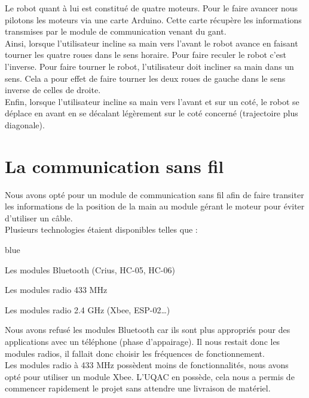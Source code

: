 {Le robot quant à lui est constitué de quatre moteurs. Pour le faire avancer nous pilotons les moteurs via une carte Arduino. Cette carte récupère les informations transmises par le module de communication venant du gant. \\

Ainsi, lorsque l'utilisateur incline sa main vers l'avant le robot avance en faisant tourner les quatre roues dans le sens horaire. Pour faire reculer le robot c'est l'inverse.
Pour faire tourner le robot, l'utilisateur doit incliner sa main dans un sens. Cela a pour effet de faire tourner les deux roues de gauche dans le sens inverse de celles de droite. \\

Enfin, lorsque l'utilisateur incline sa main vers l'avant et sur un coté, le robot se déplace en avant en se décalant légèrement sur le coté concerné (trajectoire plus diagonale).

\section{La communication sans fil}

Nous avons opté pour un module de communication sans fil afin de faire transiter les informations de la position de la main au module gérant le moteur pour éviter d'utiliser un câble.\\
Plusieurs technologies étaient disponibles telles que :

\begin{items}{blue}{\Triangle}
    \item Les modules Bluetooth (Crius, HC-05, HC-06)
    \item Les modules radio 433 MHz
    \item Les modules radio 2.4 GHz (Xbee, ESP-02…)
\end{items}


Nous avons refusé les modules Bluetooth car ils sont plus appropriés pour des applications avec un téléphone (phase d'appairage). Il nous restait donc les modules radios, il fallait donc choisir les fréquences de fonctionnement.\\

Les modules radio à 433 MHz possèdent moins de fonctionnalités, nous avons opté pour utiliser un module Xbee. L’UQAC en possède, cela nous a permis de commencer rapidement le projet sans attendre une livraison de matériel.\\

 
}
